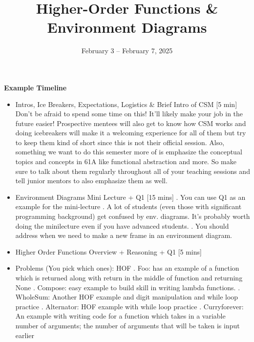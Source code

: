\documentclass{exam}
\title{Higher-Order Functions \& Environment Diagrams}
\date{February 3 -- February 7, 2025}
\begin{document}
\maketitle

\begin{meta}
    \textbf{Example Timeline}
    \begin{itemize}
        \item Intros, Ice Breakers, Expectations, Logistics \& Brief Intro of CSM [5 min]
        \subitem Don't be afraid to spend some time on this! It'll likely make your job in the future easier! Prospective mentees will also get to know how CSM works and doing icebreakers will make it a welcoming experience for all of them but try to keep them kind of short since this is not their official session.
        \subitem Also, something we want to do this semester more of is emphasize the conceptual topics and concepts in 61A like functional abstraction and more. So make sure to talk about them regularly throughout all of your teaching sessions and tell junior mentors to also emphasize them as well.
        \item Environment Diagrams Mini Lecture + Q1 [15 mins]
        . You can use Q1 as an example for the mini-lecture
        . A lot of students (even those with significant programming background) get confused by env. diagrams. It's probably worth doing the minilecture even if you have advanced students.
        . You should address when we need to make a new frame in an environment diagram.
        \item Higher Order Functions Overview + Reasoning + Q1 [5 mins]
        \item Problems (You pick which ones): HOF  
        . Foo: has an example of a function which is returned along with return in the middle of function and returning None
        . Compose: easy example to build skill in writing lambda functions.
        . WholeSum: Another HOF example and digit manipulation and while loop practice
        . Alternator: HOF example with while loop practice
        . Curryforever: An example with writing code for a function which takes in a variable number of arguments; the number of arguments that will be taken is input earlier
    \end{itemize}
\end{meta} 
\end{document}
